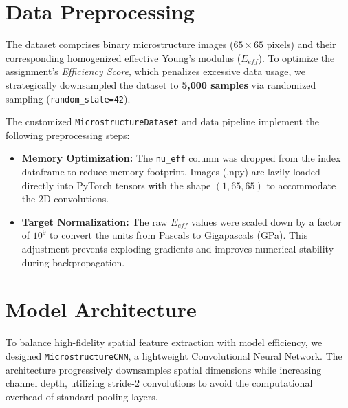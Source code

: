 \documentclass[10pt,twocolumn]{article}
\begin{document}

\section{Data Preprocessing}
The dataset comprises binary microstructure images ($65 \times 65$ pixels) and their corresponding homogenized effective Young's modulus ($E_{eff}$). To optimize the assignment's \textit{Efficiency Score}, which penalizes excessive data usage, we strategically downsampled the dataset to \textbf{5,000 samples} via randomized sampling (\texttt{random\_state=42}). 

The customized \texttt{MicrostructureDataset} and data pipeline implement the following preprocessing steps:
\begin{itemize}[nosep, leftmargin=*]
    \item \textbf{Memory Optimization:} The \texttt{nu\_eff} column was dropped from the index dataframe to reduce memory footprint. Images (.npy) are lazily loaded directly into PyTorch tensors with the shape $(1, 65, 65)$ to accommodate the 2D convolutions.
    \item \textbf{Target Normalization:} The raw $E_{eff}$ values were scaled down by a factor of $10^9$ to convert the units from Pascals to Gigapascals (GPa). This adjustment prevents exploding gradients and improves numerical stability during backpropagation.
\end{itemize}

\section{Model Architecture}
To balance high-fidelity spatial feature extraction with model efficiency, we designed \texttt{MicrostructureCNN}, a lightweight Convolutional Neural Network. The architecture progressively downsamples spatial dimensions while increasing channel depth, utilizing stride-2 convolutions to avoid the computational overhead of standard pooling layers.
\end{document}

